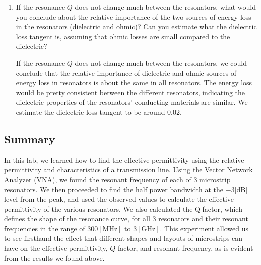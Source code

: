 \documentclass[
	letterpaper, %
	10pt, %
]{CSUniSchoolLabReport}
\begin{document}
\begin{enumerate}
\item If the resonance $Q$ does not change much between the resonators, what would you conclude about the relative importance of the two sources of energy loss in the resonators (dielectric and ohmic)? Can you estimate what the dielectric loss tangent is, assuming that ohmic losses are small compared to the dielectric?

If the resonance $Q$ does not change much between the resonators, we could conclude that the relative importance of dielectric and ohmic sources of energy loss in resonators is about the same in all resonators. The energy loss would be pretty consistent between the different resonators, indicating the dielectric properties of the resonators’ conducting materials are similar. We estimate the dielectric loss tangent to be around 0.02.

\end{enumerate}

\subsection{Summary}

In this lab, we learned how to find the effective permittivity using the relative permittivity and characteristics of a transmission line. Using the Vector Network Analyzer (VNA), we found the resonant frequency of each of 3 microstrip resonators. We then proceeded to find the half power bandwidth at the $-3$[dB] level from the peak, and used the observed values to calculate the effective permittivity of the various resonators. We also calculated the Q factor, which defines the shape of the resonance curve, for all 3 resonators and their resonant frequencies in the range of $300[\si{\mega\hertz}]$ to $3[\si{\giga\hertz}]$. This experiment allowed us to see firsthand the effect that different shapes and layouts of microstrips can have on the effective permittivity, $Q$ factor, and resonant frequency, as is evident from the results we found above.
\end{document}
